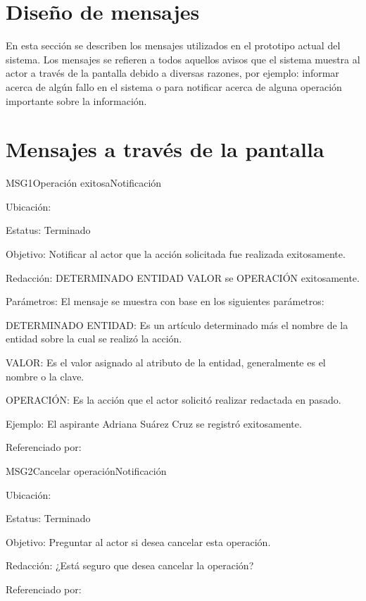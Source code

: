 \newpage
\section{Diseño de mensajes}

	En esta sección se describen los mensajes utilizados en el prototipo actual del sistema. Los mensajes se refieren a todos
	aquellos avisos que el sistema muestra al actor a través de la pantalla debido a diversas
	razones, por ejemplo: informar acerca de algún fallo en el sistema o para notificar acerca de alguna operación importante sobre
	la información.

\section{Mensajes a través de la pantalla}

\begin{mensaje}{MSG1}{Operación exitosa}{Notificación}
	\item[Ubicación:] \msjSuperior
	\item[Estatus:] Terminado
	\item[Objetivo:] Notificar al actor que la acción solicitada fue realizada exitosamente.
	\item[Redacción:] DETERMINADO ENTIDAD VALOR se OPERACIÓN exitosamente.
	\item[Parámetros:] El mensaje se muestra con base en los siguientes parámetros:
	\begin{Citemize} 
		\item DETERMINADO ENTIDAD: Es un artículo determinado más el nombre de la entidad sobre la cual se realizó la acción.
		\item VALOR: Es el valor asignado al atributo de la entidad, generalmente es el nombre o la clave.
		\item OPERACIÓN: Es la acción que el actor solicitó realizar redactada en pasado.
	\end{Citemize}
	\item[Ejemplo:] El aspirante Adriana Suárez Cruz se registró exitosamente.

	\item[Referenciado por:] 
\end{mensaje}

\begin{mensaje}{MSG2}{Cancelar operación}{Notificación}
	\item[Ubicación:] \msjEmergente
	\item[Estatus:] Terminado
	\item[Objetivo:] Preguntar al actor si desea cancelar esta operación.
	\item[Redacción:] ¿Está seguro que desea cancelar la operación?
	\item[Referenciado por:] 
\end{mensaje}

